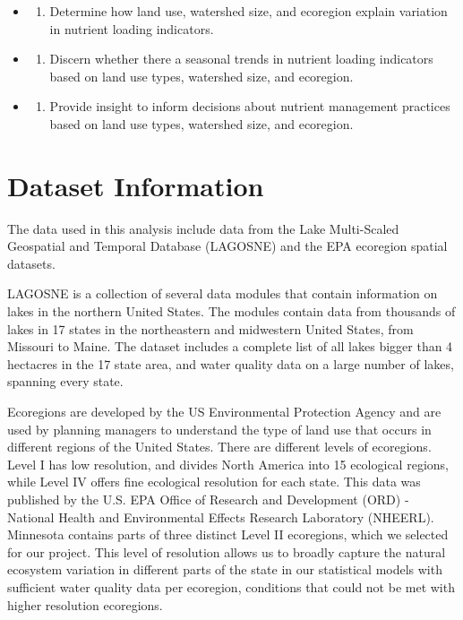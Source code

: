 \documentclass[12pt,]{article}
\providecommand{\tightlist}{%
  \setlength{\itemsep}{0pt}\setlength{\parskip}{0pt}}
\begin{document}
\begin{itemize}
\item
  \begin{enumerate}
  \def\labelenumi{\arabic{enumi}.}
  \tightlist
  \item
    Determine how land use, watershed size, and ecoregion explain
    variation in nutrient loading indicators.
  \end{enumerate}
\item
  \begin{enumerate}
  \def\labelenumi{\arabic{enumi}.}
  \setcounter{enumi}{1}
  \tightlist
  \item
    Discern whether there a seasonal trends in nutrient loading
    indicators based on land use types, watershed size, and ecoregion.
  \end{enumerate}
\item
  \begin{enumerate}
  \def\labelenumi{\arabic{enumi}.}
  \setcounter{enumi}{2}
  \tightlist
  \item
    Provide insight to inform decisions about nutrient management
    practices based on land use types, watershed size, and ecoregion.
  \end{enumerate}
\end{itemize}

\newpage

\hypertarget{dataset-information}{%
\section{Dataset Information}\label{dataset-information}}

The data used in this analysis include data from the Lake Multi-Scaled
Geospatial and Temporal Database (LAGOSNE) and the EPA ecoregion spatial
datasets.

LAGOSNE is a collection of several data modules that contain information
on lakes in the northern United States. The modules contain data from
thousands of lakes in 17 states in the northeastern and midwestern
United States, from Missouri to Maine. The dataset includes a complete
list of all lakes bigger than 4 hectacres in the 17 state area, and
water quality data on a large number of lakes, spanning every state.

Ecoregions are developed by the US Environmental Protection Agency and
are used by planning managers to understand the type of land use that
occurs in different regions of the United States. There are different
levels of ecoregions. Level I has low resolution, and divides North
America into 15 ecological regions, while Level IV offers fine
ecological resolution for each state. This data was published by the
U.S. EPA Office of Research and Development (ORD) - National Health and
Environmental Effects Research Laboratory (NHEERL). Minnesota contains
parts of three distinct Level II ecoregions, which we selected for our
project. This level of resolution allows us to broadly capture the
natural ecosystem variation in different parts of the state in our
statistical models with sufficient water quality data per ecoregion,
conditions that could not be met with higher resolution ecoregions.
\end{document}
